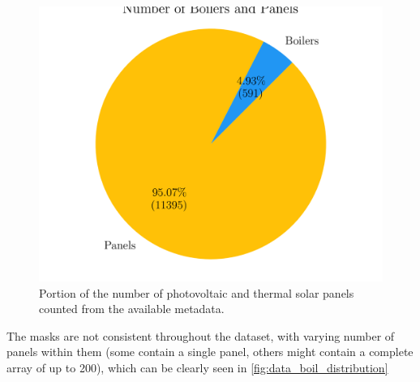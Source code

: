 \documentclass[conference]{IEEEtran}
\begin{document}
\begin{figure}[H]
    \centering
    \includegraphics[width=1\linewidth]{assets/data_distribution.png}
    \caption{Portion of the number of photovoltaic and thermal solar panels counted from the available metadata.}
    \label{fig:data_distribution}
\end{figure}


The masks are not consistent throughout the dataset, with varying number of panels within them (some contain a single panel, others might contain a complete array of up to 200), which can be clearly seen in \ref{fig:data_boil_distribution}
\end{document}
